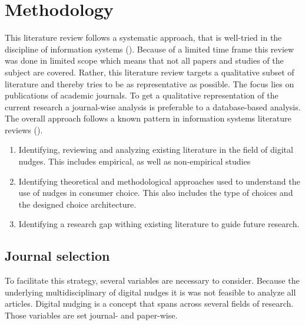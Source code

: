 \section{Methodology}

This literature review follows a systematic approach, that is well-tried in the discipline of information systems (\cite{webster_analyzing_2002}). Because of a limited time frame this review was done in limited scope which means that not all papers and studies of the subject are covered. Rather, this literature review targets a qualitative subset of literature and thereby tries to be as representative as possible. The focus lies on publications of academic journals. To get a qualitative representation of the current research a journal-wise analysis is preferable to a database-based analysis. The overall approach follows a known pattern in information systems literature reviews (\cite{alavi_review_1992}).
\begin{enumerate}
\item Identifying, reviewing and analyzing existing literature in the field of digital nudges. This includes empirical, as well as non-empirical studies
\item Identifying theoretical and methodological approaches used to understand the use of nudges in consumer choice. This also includes the type of choices and the designed choice architecture.
\item Identifying a research gap withing existing literature to guide future research.
\end{enumerate}

\subsection{Journal selection}
To facilitate this strategy, several variables are necessary to consider. Because the underlying multidisciplinary  of digital nudges it is was not feasible to analyze all articles. Digital nudging is a concept that spans across several fields of research. Those variables are set journal- and paper-wise. 

